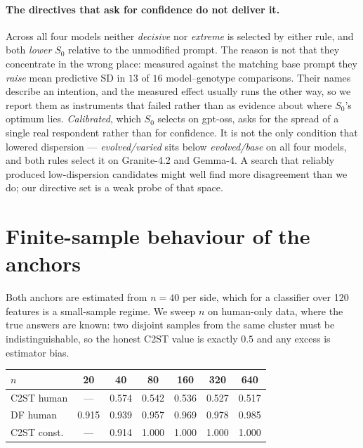 \documentclass[11pt]{article}
\begin{document}
\paragraph{The directives that ask for confidence do not deliver it.} Across all
four models neither \textit{decisive} nor \textit{extreme} is selected by either
rule, and both \emph{lower} $S_0$ relative to the unmodified prompt. The reason
is not that they concentrate in the wrong place: measured against the matching
base prompt they \emph{raise} mean predictive SD in $13$ of $16$ model--genotype
comparisons. Their names describe an intention, and the measured effect usually
runs the other way, so we report them as instruments that failed rather than as
evidence about where $S_0$'s optimum lies. \textit{Calibrated}, which $S_0$ selects on gpt-oss, asks for the spread of a
single real respondent rather than for confidence. It is not the only condition
that lowered dispersion --- \textit{evolved/varied} sits below
\textit{evolved/base} on all four models, and both rules select it on Granite-4.2
and Gemma-4. A search that reliably
produced low-dispersion candidates might well find more disagreement than we do;
our directive set is a weak probe of that space.

\section{Finite-sample behaviour of the anchors}
\label{app:samplesize}

Both anchors are estimated from $n{=}40$ per side, which for a classifier over
120 features is a small-sample regime. We sweep $n$ on human-only data, where the
true answers are known: two disjoint samples from the same cluster must be
indistinguishable, so the honest C2ST value is exactly $0.5$ and any excess is
estimator bias.

\begin{center}\scriptsize
\setlength{\tabcolsep}{3pt}
\begin{tabular}{lcccccc}
\toprule
$n$ & 20 & 40 & 80 & 160 & 320 & 640\\
\midrule
C2ST human & --- & 0.574 & 0.542 & 0.536 & 0.527 & 0.517\\
DF human & 0.915 & 0.939 & 0.957 & 0.969 & 0.978 & 0.985\\
C2ST const. & --- & 0.914 & 1.000 & 1.000 & 1.000 & 1.000\\
\bottomrule
\end{tabular}
\end{center}
\end{document}
